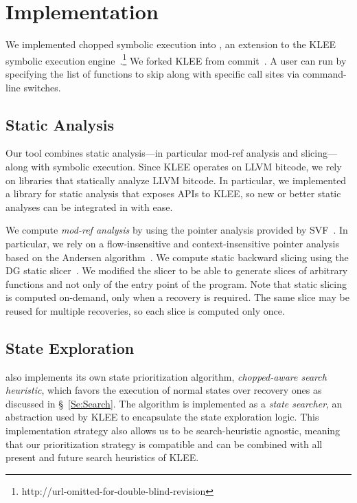 
\chapter{Implementation}\label{chapter:implementation}

We implemented chopped symbolic execution into \toolname, an extension
to the KLEE symbolic execution
engine~\cite{klee}.\footnote{http://url-omitted-for-double-blind-revision}
We forked KLEE from commit~. A user can run \toolname by
specifying the list of functions to skip along with specific call
sites via command-line switches.

\section{Static Analysis} Our tool combines static analysis---in
particular mod-ref analysis and slicing---along with symbolic
execution. Since KLEE operates on LLVM bitcode, we rely on libraries
that statically analyze LLVM bitcode. In particular, we implemented a
library for static analysis that exposes APIs to KLEE, so new or
better static analyses can be integrated in \toolname with ease.

We compute \textit{mod-ref analysis} by using the pointer analysis
provided by SVF~\cite{sui2016svf}. In particular, we rely on a
flow-insensitive and context-insensitive pointer analysis based on the
Andersen algorithm~\cite{andersen:pointeranalysis}. We compute static
backward slicing using the DG static slicer~\cite{dg}. We modified the
slicer to be able to generate slices of arbitrary functions and not
only of the entry point of the program. Note that static slicing is
computed on-demand, only when a recovery is required. The same slice
may be reused for multiple recoveries, so each slice is computed only
once.

\section{State Exploration} \toolname also implements its own state
prioritization algorithm, \textit{chopped-aware search heuristic},
which favors the execution of normal states over recovery ones as
discussed in \S~\ref{Se:Search}. The algorithm is implemented as a
\textit{state searcher}, an abstraction used by KLEE to encapsulate
the state exploration logic. This implementation strategy also allows
us to be search-heuristic agnostic, meaning that our prioritization
strategy is compatible and can be combined with all present and future
search heuristics of KLEE.


